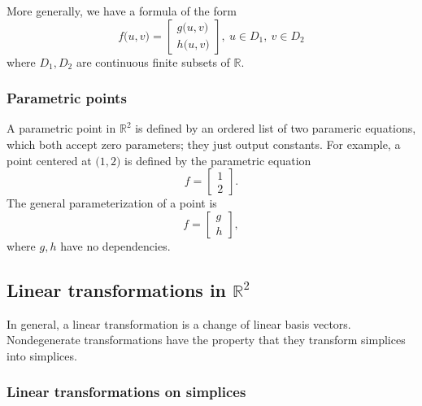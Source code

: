 More generally, we have a formula of the form 
\begin{equation}
    f\lparen u,v\rparen=
    \begin{bmatrix}
        g\lparen u,v\rparen \\
        h\lparen u,v\rparen
    \end{bmatrix},\ u\in D_{1},\ v\in D_{2}
\end{equation}
where \(D_{1},D_{2}\) are continuous finite subsets of \(\mathbb{R}\).

\subsubsection{Parametric points}

A parametric point in \(\mathbb{R}^{2}\) is defined by an ordered 
list of two parameric equations, which both accept zero parameters; 
they just output constants. For example, a point centered at 
\(\lparen1,2\rparen\) is defined by the parametric equation 
\[
    f=
    \begin{bmatrix}
        1 \\
        2
    \end{bmatrix}.
\]
The general parameterization of a point is 
\begin{equation}
    f=
    \begin{bmatrix}
        g \\
        h
    \end{bmatrix},
\end{equation}
where \(g,h\) have no dependencies.

\subsection{Linear transformations in \texorpdfstring{\(\mathbb{R}^{2}\)}{R2}}

In general, a linear transformation is a change of linear basis vectors.
Nondegenerate transformations have the property that they transform 
simplices into simplices.

\subsubsection{Linear transformations on simplices}

